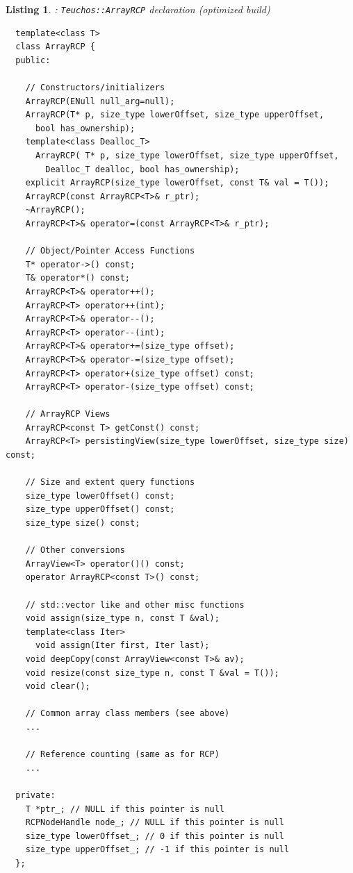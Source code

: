 \documentclass[pdf,ps2pdf,11pt]{SANDreport}
\newtheorem{listing}{Listing}
\begin{document}
\begin{listing}: {}\texttt{Teuchos::ArrayRCP} declaration (optimized build)\\
\label{listing:ArrayRCP}
{\small\begin{verbatim}
  template<class T>
  class ArrayRCP {
  public:
  
    // Constructors/initializers
    ArrayRCP(ENull null_arg=null);
    ArrayRCP(T* p, size_type lowerOffset, size_type upperOffset,
      bool has_ownership);
    template<class Dealloc_T>
      ArrayRCP( T* p, size_type lowerOffset, size_type upperOffset,
        Dealloc_T dealloc, bool has_ownership);
    explicit ArrayRCP(size_type lowerOffset, const T& val = T());
    ArrayRCP(const ArrayRCP<T>& r_ptr);
    ~ArrayRCP();
    ArrayRCP<T>& operator=(const ArrayRCP<T>& r_ptr);

    // Object/Pointer Access Functions 
    T* operator->() const;
    T& operator*() const;
    ArrayRCP<T>& operator++();
    ArrayRCP<T> operator++(int);
    ArrayRCP<T>& operator--();
    ArrayRCP<T> operator--(int);
    ArrayRCP<T>& operator+=(size_type offset);
    ArrayRCP<T>& operator-=(size_type offset);
    ArrayRCP<T> operator+(size_type offset) const;
    ArrayRCP<T> operator-(size_type offset) const;
  
    // ArrayRCP Views 
    ArrayRCP<const T> getConst() const;
    ArrayRCP<T> persistingView(size_type lowerOffset, size_type size) const;
  
    // Size and extent query functions 
    size_type lowerOffset() const;
    size_type upperOffset() const;
    size_type size() const;
  
    // Other conversions
    ArrayView<T> operator()() const;
    operator ArrayRCP<const T>() const;
  
    // std::vector like and other misc functions
    void assign(size_type n, const T &val);
    template<class Iter>
      void assign(Iter first, Iter last);
    void deepCopy(const ArrayView<const T>& av);
    void resize(const size_type n, const T &val = T());
    void clear();

    // Common array class members (see above)
    ...
  
    // Reference counting (same as for RCP)
    ...
  
  private:
    T *ptr_; // NULL if this pointer is null
    RCPNodeHandle node_; // NULL if this pointer is null
    size_type lowerOffset_; // 0 if this pointer is null
    size_type upperOffset_; // -1 if this pointer is null
  };
  

\end{verbatim}}
\end{listing}
\end{document}
